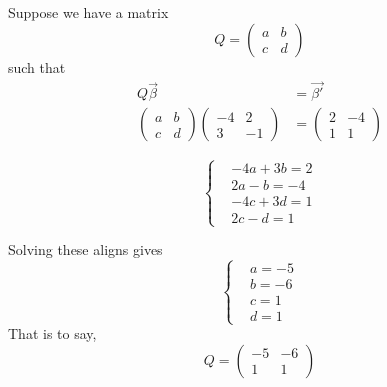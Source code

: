 \begin{homeworkProblem}

\solution

Suppose we have a matrix \[
Q = \begin{pmatrix}
    a & b \\
    c & d
\end{pmatrix}
\] such that
\[
\begin{aligned}
    Q\vec{\beta} &= \vec{\beta'} \\
    \begin{pmatrix}
        a & b \\
        c & d
    \end{pmatrix} \begin{pmatrix}
        -4 &  2 \\
        3  & -1
    \end{pmatrix} &=
    \begin{pmatrix}
        2 & -4 \\
        1 &  1
    \end{pmatrix}
\end{aligned}
\]

\[\left\{
\begin{aligned}
    &-4a + 3b = 2\\
    & 2a - b = -4 \\
    &-4c + 3d = 1\\
    & 2c - d = 1
\end{aligned}\right.
\]

Solving these aligns gives
\[\left\{
\begin{aligned}
        &a = -5\\
        &b = -6\\
        &c =  1\\
        &d =  1
\end{aligned}\right.
\]
That is to say,
\[
Q =
\begin{pmatrix}
    -5 & -6 \\
     1 &  1
\end{pmatrix}\]

\end{homeworkProblem}

